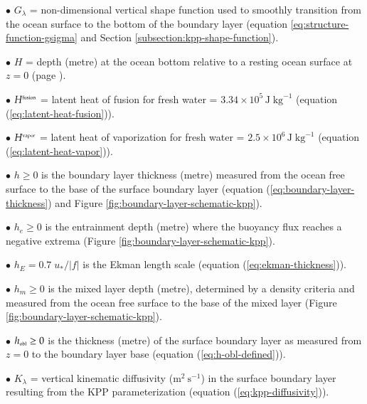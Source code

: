 \begin{mdframed}[backgroundcolor=lightgray!50]
\begin{trivlist}
\item[$\bullet$] $G_{\lambda}$ = non-dimensional vertical shape function used to
  smoothly transition from the ocean surface to the bottom of the
  boundary layer (equation \ref{eq:structure-function-gsigma} and
  Section \ref{subsection:kpp-shape-function}).

\item[$\bullet$] $H$ = depth (metre) at the ocean bottom relative to a
  resting ocean surface at $z=0$ (page
  \pageref{geopotential_defined}).

\item[$\bullet$] $H^{\mbox{\tiny fusion}}$ = latent heat of fusion for
  fresh water = $3.34 \times 10^{5} \, \mbox{J} \;\mbox{kg}^{-1}$
  (equation (\ref{eq:latent-heat-fusion})).

\item[$\bullet$] $H^{\mbox{\tiny vapor}}$ = latent heat of
  vaporization for fresh water = $2.5 \times 10^{6} \, \mbox{J} \;
  \mbox{kg}^{-1}$ (equation (\ref{eq:latent-heat-vapor})).

\item[$\bullet$] $h \ge 0$ is the boundary layer thickness (metre) measured from
  the ocean free surface to the base of the surface boundary layer
  (equation (\ref{eq:boundary-layer-thickness}) and Figure
  \ref{fig:boundary-layer-schematic-kpp}).

\item[$\bullet$] $h_{e} \ge 0$ is the entrainment depth (metre) where
  the buoyancy flux reaches a negative extrema (Figure
  \ref{fig:boundary-layer-schematic-kpp}).

\item[$\bullet$] $h_{E} = 0.7 \; u_{*} /|f|$ is the Ekman length scale
  (equation (\ref{eq:ekman-thickness})).

\item[$\bullet$] $h_{m} \ge 0$ is the mixed layer depth (metre),
  determined by a density criteria and measured from the ocean free
  surface to the base of the mixed layer (Figure
  \ref{fig:boundary-layer-schematic-kpp}).

\item[$\bullet$] $h_{\mbox{\tiny obl}} \ge 0$ is the thickness (metre) of the
  surface boundary layer as measured from $z=0$ to the boundary layer
  base (equation (\ref{eq:h-obl-defined})).

\item[$\bullet$] $K_{\lambda}$ = vertical kinematic diffusivity
  ($\mbox{m}^{2}~\mbox{s}^{-1}$) in the surface boundary layer
  resulting from the KPP parameterization (equation
  (\ref{eq:kpp-diffusivity})).


\end{trivlist}
\end{mdframed}
